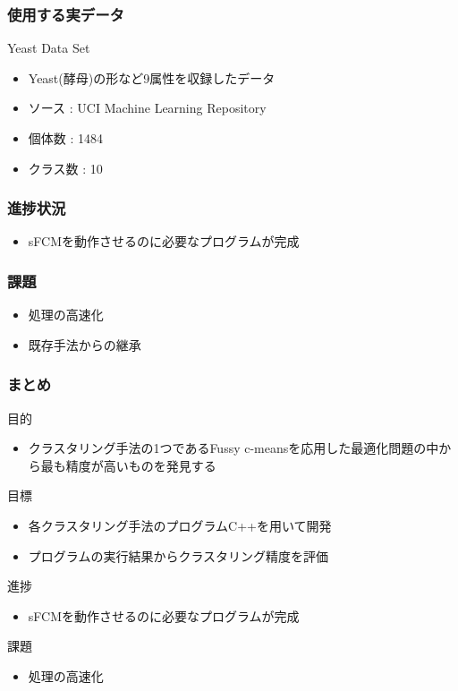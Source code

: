 \documentclass[13pt,dvipdfmx]{beamer}
\begin{document}
\begin{frame}\frametitle{使用する実データ}
  \begin{block}{Yeast Data Set}
    \begin{itemize}
    \item Yeast(酵母)の形など9属性を収録したデータ
    \item ソース : UCI  Machine Learning Repository
    \item 個体数 : 1484
    \item クラス数 : 10
    \end{itemize}
  \end{block}
\end{frame}

\begin{frame}\frametitle{進捗状況}
\begin{itemize}
 \item sFCMを動作させるのに必要なプログラムが完成
\end{itemize}
\end{frame}

\begin{frame}\frametitle{課題}
\begin{itemize}
\item 処理の高速化
\item 既存手法からの継承
\end{itemize}
\end{frame}

\begin{frame}\frametitle{まとめ}
  \begin{block}{目的}
    \begin{itemize}
    \item クラスタリング手法の1つであるFussy c-meansを応用した最適化問題の中から最も精度が高いものを発見する
    \end{itemize}
  \end{block}
  \begin{block}{目標}
    \begin{itemize}
    \item 各クラスタリング手法のプログラムC++を用いて開発
    \item プログラムの実行結果からクラスタリング精度を評価
    \end{itemize}
  \end{block}
  \begin{block}{進捗}
    \begin{itemize}
    \item sFCMを動作させるのに必要なプログラムが完成
    \end{itemize}
  \end{block}
  \begin{block}{課題}
    \begin{itemize}
    \item 処理の高速化
    \end{itemize}
  \end{block}
\end{frame}
\end{document}
